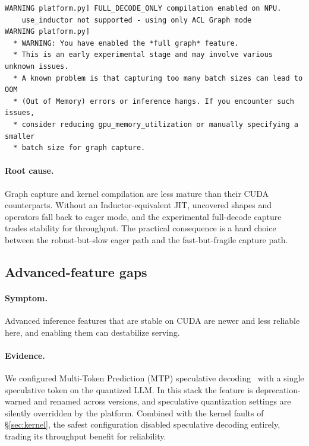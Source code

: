 \documentclass{article}
\begin{document}
\begin{lstlisting}[caption={Full-graph capture carries an explicit experimental/OOM/hang warning.},label={lst:fullgraph}]
WARNING platform.py] FULL_DECODE_ONLY compilation enabled on NPU.
    use_inductor not supported - using only ACL Graph mode
WARNING platform.py]
  * WARNING: You have enabled the *full graph* feature.
  * This is an early experimental stage and may involve various unknown issues.
  * A known problem is that capturing too many batch sizes can lead to OOM
  * (Out of Memory) errors or inference hangs. If you encounter such issues,
  * consider reducing gpu_memory_utilization or manually specifying a smaller
  * batch size for graph capture.
\end{lstlisting}

\paragraph{Root cause.} Graph capture and kernel compilation are less mature than
their CUDA counterparts. Without an Inductor-equivalent JIT, uncovered shapes and
operators fall back to eager mode, and the experimental full-decode capture trades
stability for throughput. The practical consequence is a hard choice between the
robust-but-slow eager path and the fast-but-fragile capture path.

\subsection{Advanced-feature gaps}
\label{sec:advanced}
\paragraph{Symptom.} Advanced inference features that are stable on CUDA are newer
and less reliable here, and enabling them can destabilize serving.

\paragraph{Evidence.} We configured Multi-Token Prediction (MTP) speculative
decoding~\cite{speculative,medusa,eagle} with a single speculative token on the
quantized LLM. In this stack the feature is deprecation-warned and renamed across
versions, and speculative quantization settings are silently overridden by the
platform. Combined with the kernel faults of \S\ref{sec:kernel}, the safest
configuration disabled speculative decoding entirely, trading its throughput
benefit for reliability.
\end{document}
